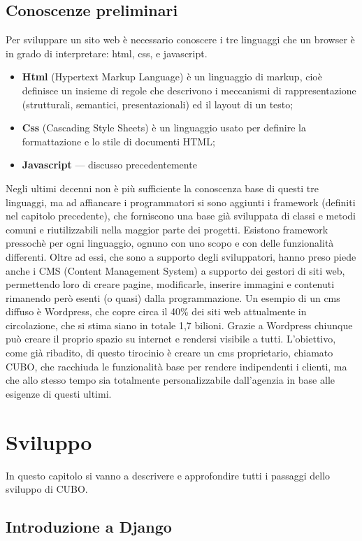 \documentclass[12pt,a4paper]{article}
\begin{document}
\subsection{Conoscenze preliminari}
Per sviluppare un sito web è necessario conoscere i tre linguaggi che un browser è in grado di interpretare: html, css, e javascript.
\begin{itemize}
    \item \textbf{Html} (Hypertext Markup Language) è un linguaggio di markup, cioè definisce un insieme di regole che descrivono i meccanismi di rappresentazione (strutturali, semantici, presentazionali) ed il layout di un testo;
    \item \textbf{Css} (Cascading Style Sheets) è un linguaggio usato per definire la formattazione e lo stile di documenti HTML;
    \item \textbf{Javascript} --- discusso precedentemente
\end{itemize}

Negli ultimi decenni non è più sufficiente la conoscenza base di questi tre linguaggi, ma ad affiancare i programmatori si sono aggiunti i framework (definiti nel capitolo precedente), che forniscono una base già sviluppata di classi e metodi comuni e riutilizzabili nella maggior parte dei progetti. Esistono framework pressochè per ogni linguaggio, ognuno con uno scopo e con delle funzionalità differenti.
Oltre ad essi, che sono a supporto degli sviluppatori, hanno preso piede anche i CMS (Content Management System) a supporto dei	gestori di siti web, permettendo loro di creare pagine, modificarle, inserire immagini e contenuti rimanendo però esenti (o quasi) dalla programmazione.
Un esempio di un cms diffuso è Wordpress, che copre circa il 40\% dei siti web attualmente in circolazione, che si stima siano in totale 1,7 bilioni.
Grazie a Wordpress chiunque può creare il proprio spazio su internet e rendersi visibile a tutti.
L’obiettivo, come già ribadito, di questo tirocinio è creare un cms proprietario, chiamato CUBO, che racchiuda le funzionalità base per rendere indipendenti i clienti, ma che allo stesso tempo sia totalmente personalizzabile dall’agenzia in base alle esigenze di questi ultimi.
\clearpage
\section{Sviluppo}
In questo capitolo si vanno a descrivere e approfondire tutti i passaggi dello sviluppo di CUBO.
\subsection{Introduzione a Django}
\end{document}
